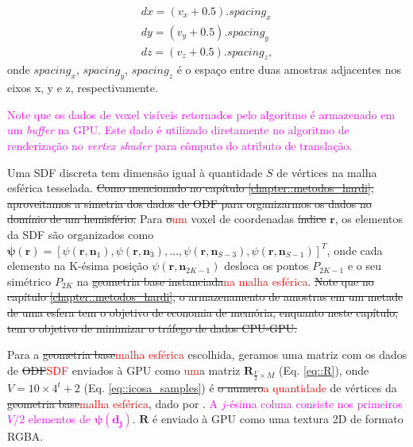 \begin{align}
 \label{eq::translation}
    dx = (v_x + 0.5).spacing_x \nonumber\\
    dy = (v_y + 0.5).spacing_y \\
    dz = (v_z + 0.5).spacing_z \nonumber,
\end{align}
onde $spacing_x$, $spacing_y$, $spacing_z$ é o espaço entre duas amostras adjacentes nos eixos x, y e z, respectivamente.

\textcolor{magenta}{
Note que os dados de voxel visíveis retornados pelo algoritmo é armazenado em um \textit{buffer} na GPU. Este dado é utilizado diretamente no algoritmo de renderização no \textit{vertex shader} para cômputo do atributo de translação.
}

Uma SDF discreta tem dimensão igual à quantidade $S$ de vértices na malha esférica tesselada. 
\sout{Como mencionado no capítulo \ref{chapter::metodos_hardi}, aproveitamos a simetria dos dados de ODF para organizarmos os dados no domínio de um hemisfério.} Para \sout{o}\textcolor{red}{um} voxel de coordenadas \sout{índice} $\mathbf{r}$, os elementos da SDF são organizados como $\boldsymbol{\psi}(\mathbf{r}) = [
\psi(\mathbf{r}, \mathbf{n}_1),
\psi(\mathbf{r}, \mathbf{n}_3), ...,
\psi(\mathbf{r}, \mathbf{n}_{S-3}),
\psi(\mathbf{r}, \mathbf{n}_{S-1})]^T$, onde cada elemento na K-ésima posição $\psi(\mathbf{r}, \mathbf{n}_{2K-1})$ desloca os pontos $P_{2K-1}$ e o seu simétrico $P_{2K}$ na \sout{geometria base instanciada}\textcolor{red}{na malha esférica}. \sout{Note que no capítulo \ref{chapter::metodos_hardi}, o armazenamento de amostras em um metade de uma esfera tem o objetivo de economia de memória, enquanto neste capítulo, tem o objetivo de minimizar o tráfego de dados CPU-GPU.}

Para a \sout{geometria base}\textcolor{red}{malha esférica} escolhida, geramos uma matriz com os dados de \sout{ODF}\textcolor{red}{SDF} enviados à GPU como \textcolor{red}{um}a matriz $\mathbf{R}_{\frac{V}{2} \times M}$ (Eq. \ref{eq::R}), onde $V = 10 \times 4^t + 2$ (Eq. \ref{eq::icosa_samples}) é \sout{o numero}\textcolor{red}{a quantidade} de vértices da \sout{geometria base}\textcolor{red}{malha esférica}, dado por . \textcolor{magenta}{A $j$-ésima coluna consiste nos primeiros $V/2$ elementos de $\boldsymbol{\psi}(\mathbf{d_j})$}. $\mathbf{R}$ é enviado à GPU como uma textura 2D de formato RGBA.

